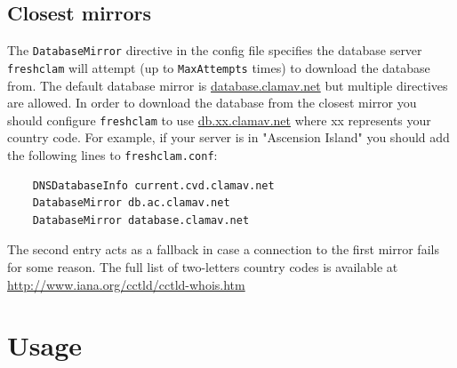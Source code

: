 \documentclass[a4paper,titlepage,12pt]{article}
\begin{document}
    \subsection{Closest mirrors}
    The \verb+DatabaseMirror+ directive in the config file specifies the
    database server \verb+freshclam+ will attempt (up to \verb+MaxAttempts+
    times) to download the database from. The default database mirror
    is \url{database.clamav.net} but multiple directives are allowed.
    In order to download the database from the closest mirror you should  
    configure \verb+freshclam+ to use \url{db.xx.clamav.net} where xx
    represents your country code. For example, if your server is in "Ascension
    Island" you should add the following lines to \verb+freshclam.conf+:
    \begin{verbatim}
	DNSDatabaseInfo current.cvd.clamav.net
	DatabaseMirror db.ac.clamav.net
	DatabaseMirror database.clamav.net
    \end{verbatim}
    The second entry acts as a fallback in case a connection to the first
    mirror fails for some reason. The full list of two-letters country codes
    is available at \url{http://www.iana.org/cctld/cctld-whois.htm}

    \section{Usage}
\end{document}
